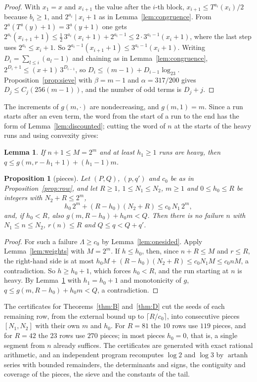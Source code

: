 \documentclass[11pt]{amsart}
\newtheorem{lemma}[theorem]{Lemma}
\newtheorem{proposition}[theorem]{Proposition}
\theoremstyle{definition}
\theoremstyle{remark}
\begin{document}
\begin{proof}
With $x_1=x$ and $x_{i+1}$ the value after the $i$-th block, $x_{i+1}\le T^{a_i}(x_i)/2$ because $b_i\ge1$, and $2^{a_i}\mid x_i+1$ as in Lemma~\ref{lem:congruence}. From $2^{a}(T^{a}(y)+1)=3^{a}(y+1)$ one gets $2^{a_i}(x_{i+1}+1)\le\tfrac12\,3^{a_i}(x_i+1)+2^{a_i-1}\le2\cdot3^{a_i-1}(x_i+1)$, where the last step uses $2^{a_i}\le x_i+1$. So $2^{a_i-1}(x_{i+1}+1)\le3^{a_i-1}(x_i+1)$. Writing $D_i=\sum_{l\le i}(a_l-1)$ and chaining as in Lemma~\ref{lem:congruence}, $2^{D_i+1}\le(x+1)\,3^{D_{i-1}}$, so $D_i\le(m-1)+D_{i-1}\log_23$. Proposition~\ref{prop:sieve} with $\beta=m-1$ and $\alpha=317/200$ gives $D_j\le C_j(256(m-1))$, and the number of odd terms is $D_j+j$.
\end{proof}

The increments of $g(m,\cdot)$ are nondecreasing, and $g(m,1)=m$. Since a run starts after an even term, the word from the start of a run to the end has the form of Lemma~\ref{lem:discounted}; cutting the word of $n$ at the starts of the heavy runs and using convexity gives:

\begin{lemma}\label{lem:segments}
If $n+1\le M=2^{m}$ and at least $h_1\ge1$ runs are heavy, then $q\le g(m,r-h_1+1)+(h_1-1)m$.
\end{lemma}

\begin{proposition}[pieces]\label{prop:piece}
Let $(P,Q)$, $(p,q')$ and $c_0$ be as in Proposition~\ref{prop:row}, and let $R\ge1$, $1\le N_1\le N_2$, $m\ge1$ and $0\le h_0\le R$ be integers with $N_2+R\le2^{m}$,
\[
h_0\,2^{m}+(R-h_0)(N_2+R)\le c_0\,N_1\,2^{m},
\]
and, if $h_0<R$, also $g(m,R-h_0)+h_0m<Q$.
Then there is no failure $n$ with $N_1\le n\le N_2$, $r(n)\le R$ and $Q\le q<Q+q'$.
\end{proposition}

\begin{proof}
For such a failure $\Lambda\ge c_0$ by Lemma~\ref{lem:onesided}. Apply Lemma~\ref{lem:weights} with $M=2^{m}$. If $h\le h_0$, then, since $n+R\le M$ and $r\le R$, the right-hand side is at most $h_0M+(R-h_0)(N_2+R)\le c_0N_1M\le c_0nM$, a contradiction. So $h\ge h_0+1$, which forces $h_0<R$, and the run starting at $n$ is heavy. By Lemma~\ref{lem:segments} with $h_1=h_0+1$ and monotonicity of $g$, $q\le g(m,R-h_0)+h_0m<Q$, a contradiction.
\end{proof}

The certificates for Theorems~\ref{thm:B} and~\ref{thm:D} cut the seeds of each remaining row, from the external bound up to $\lceil R/c_0\rceil$, into consecutive pieces $[N_1,N_2]$ with their own $m$ and $h_0$. For $R=81$ the $10$ rows use $119$ pieces, and for $R=42$ the $23$ rows use $270$ pieces; in most pieces $h_0=0$, that is, a single segment from $n$ already suffices. The certificates are generated with exact rational arithmetic, and an independent program recomputes $\log2$ and $\log3$ by $\operatorname{artanh}$ series with bounded remainders, the determinants and signs, the contiguity and coverage of the pieces, the sieve and the constants of the tail.
\end{document}
